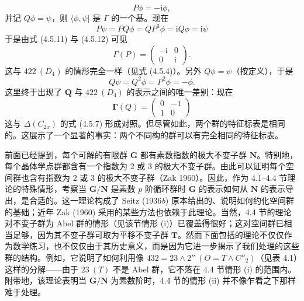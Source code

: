 \begin{equation*}
P\phi = -\mathrm{i}\phi,
\tag{4.5.11}
\end{equation*}
并记 $Q\phi = \psi$，则 $\langle \phi, \psi |$ 是 $\Gamma$ 的一个基。现在
\begin{equation*}
P\psi = PQ\phi = QP^{3}\phi = \mathrm{i}Q\phi = \mathrm{i}\psi
\tag{4.5.12}
\end{equation*}
于是由式 (4.5.11) 与 (4.5.12) 可见
\begin{equation*}
\Gamma(P) = \begin{pmatrix} -\mathrm{i} & 0\\ 0 & \mathrm{i} \end{pmatrix}.
\tag{4.5.13}
\end{equation*}
这与 $422\ (D_{4})$ 的情形完全一样（见式 (4.5.4)）。另外 $Q\phi = \psi$（按定义），于是
\begin{equation*}
Q\psi = Q^{2}\phi = P^{2}\phi = -\phi.
\tag{4.5.14}
\end{equation*}
这里终于出现了 $\mathbf{Q}$ 与 $422\ (D_{4})$ 的表示之间的唯一差别：现在
\begin{equation*}
\boldsymbol{\Gamma}(Q) = \begin{pmatrix} 0 & -1\\ 1 & 0 \end{pmatrix}
\tag{4.5.15}
\end{equation*}
这与 $\Delta(C_{2x})$ 的式 (4.5.7) 形成对照。但尽管如此，两个群的特征标表是相同的。这展示了一个显著的事实：两个不同构的群可以有完全相同的特征标表。

前面已经提到，每个可解的有限群 $\mathbf{G}$ 都有素数指数的极大不变子群 $\mathbf{N}$。特别地，每个晶体学点群都含有一个指数为 2 或 3 的极大不变子群。由此可以证明每个空间群也含有指数为 2 或 3 的极大不变子群（Zak 1960）。因此，作为 4.1--4.4 节理论的特殊情形，考察当 $\mathbf{G}/\mathbf{N}$ 是素数 $p$ 阶循环群时 $\mathbf{G}$ 的表示如何从 $\mathbf{N}$ 的表示导出，是合适的。这一理论构成了 Seitz (1936\textit{b}) 原本给出的、说明如何约化空间群的基础；近年 Zak (1960) 采用的某些方法也依赖于此理论。当然，4.4 节的理论对不变子群为 Abel 群的情形（见该节情形 (i)）已覆盖得很好；这对空间群已相当足够，因为其不变子群可取为平移不变子群 $\mathbf{T}$。然而下面包括的理论不仅仅作为数学练习，也不仅仅由于其历史意义，而是因为它进一步揭示了我们处理的这些群的结构。例如，它说明了如何利用像 $432 = 23 \wedge 2''\ (O = T \wedge C''_{2})$（见表 4.1）这样的分解——由于 $23\ (T)$ 不是 Abel 群，它不落在 4.4 节情形 (i) 的范围内。附带地，该理论表明当 $\mathbf{G}/\mathbf{N}$ 为素数阶时，4.4 节的情形 (ii) 并不像乍看之下那样难于处理。

